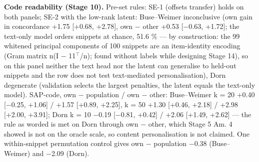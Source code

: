 \documentclass{article}
\begin{document}
\textbf{Code readability (Stage 10).} Pre-set rules: SE-1 (offsets transfer) holds on both panels; SE-2 with the low-rank latent: Buse--Weimer inconclusive (own gain in concordance +1.75 {[}+0.68, +2.78{]}, own $-$ other +0.53 {[}$-$0.63, +1.72{]}; the text-only model orders snippets at chance, 51.6 \% --- by construction: the 99 whitened principal components of 100 snippets are an item-identity encoding (Gram matrix n(I $-$ 11$^{\top}$/n); found without labels while designing Stage 14), so on this panel neither the text head nor the latent can generalise to held-out snippets and the row does not test text-mediated personalisation), Dorn degenerate (validation selects the largest penalties, the latent equals the text-only model). SAP-code, own $-$ population / own $-$ other: Buse--Weimer k = 20 +0.40 {[}$-$0.25, +1.06{]} / +1.57 {[}+0.89, +2.25{]}, k = 50 +1.30 {[}+0.46, +2.18{]} / +2.98 {[}+2.00, +3.91{]}; Dorn k = 10 $-$0.19 {[}$-$0.81, +0.42{]} / +2.06 {[}+1.49, +2.62{]} --- the rule as worded is met on Dorn through own $-$ other, which Stage 5 Am. 4 showed is not on the oracle scale, so content personalisation is not claimed. One within-snippet permutation control gives own $-$ population $-$0.38 (Buse--Weimer) and $-$2.09 (Dorn).
\end{document}
